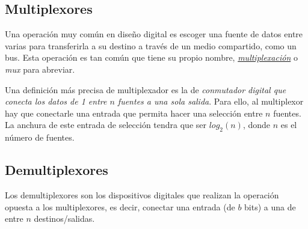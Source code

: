 \begin{itemize}
\subsection{Multiplexores}
Una operación muy común en diseño digital es escoger una fuente de datos entre varias para transferirla a su destino a través de un medio compartido, como un bus. Esta operación es tan común que tiene su propio nombre, \hyperlink{multiplexing}{\emph{multiplexación}} o \emph{mux} para abreviar.

Una definición más precisa de multiplexador es la de \textit{conmutador digital que conecta los datos de 1 entre $n$ fuentes a una sola salida}. Para ello, al multiplexor hay que conectarle una entrada que permita hacer una selección entre $n$ fuentes. La anchura de este entrada de selección tendra que ser $log_2(n)$, donde $n$ es el número de fuentes.



\subsection{Demultiplexores}
Los demultiplexores son los dispositivos digitales que realizan la operación opuesta a los multiplexores, es decir, conectar una entrada (de $b$ bits) a una de entre $n$ destinos/salidas.
\end{itemize}